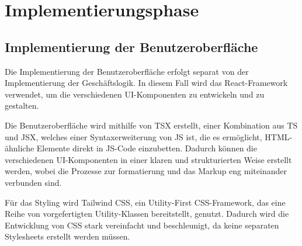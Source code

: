 \section{Implementierungsphase} 
\label{sec:Implementierungsphase}

%


\subsection{Implementierung der Benutzeroberfläche}
\label{sec:ImplementierungBenutzeroberflaeche}

Die Implementierung der Benutzeroberfläche erfolgt separat von der Implementierung der Geschäftslogik.
In diesem Fall wird das React-Framework verwendet, um die verschiedenen \ac{UI}-Komponenten zu entwickeln und zu gestalten.

Die Benutzeroberfläche wird mithilfe von \ac{TSX} erstellt, einer Kombination aus \ac{TS} und \ac{JSX}, welches einer Syntaxerweiterung von \ac{JS} ist, die es ermöglicht, \ac{HTML}-ähnliche Elemente direkt in \ac{JS}-Code einzubetten.
Dadurch können die verschiedenen \ac{UI}-Komponenten in einer klaren und strukturierten Weise erstellt werden, wobei die Prozesse zur formatierung und das Markup eng miteinander verbunden sind.

Für das Styling wird Tailwind \ac{CSS}, ein Utility-First \ac{CSS}-Framework, das eine Reihe von vorgefertigten Utility-Klassen bereitstellt, genutzt.
Dadurch wird die Entwicklung von \ac{CSS} stark vereinfacht und beschleunigt, da keine separaten Stylesheets erstellt werden müssen.

